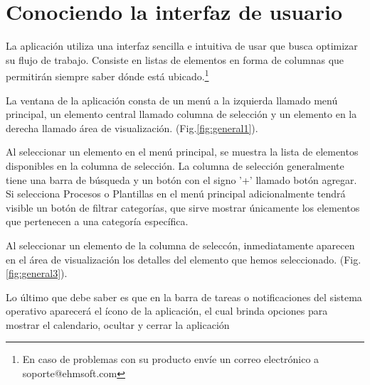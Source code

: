 

\section{Conociendo la interfaz de usuario}
La aplicaci\'on utiliza una interfaz sencilla e intuitiva de usar que busca optimizar su flujo de trabajo. Consiste en listas de elementos en forma de columnas que permitir\'an siempre saber d\'onde est\'a ubicado.\footnote{En caso de problemas con su producto env\'ie un correo
electr\'onico a \mbox{soporte@ehmsoft.com}}

La ventana de la aplicaci\'on consta de un men\'u a la izquierda llamado men\'u principal, un elemento central llamado columna de selecci\'on y un elemento en la derecha llamado \'area de visualizaci\'on. (Fig.\ref{fig:general1}). 


Al seleccionar un elemento en el men\'u principal, se muestra la lista de elementos disponibles en la columna de selecci\'on. La columna de selecci\'on generalmente tiene una barra de b\'usqueda y un bot\'on con el signo '+' llamado bot\'on agregar. Si selecciona Procesos o Plantillas en el men\'u principal adicionalmente tendr\'a visible un bot\'on de filtrar categor\'ias, que sirve mostrar \'unicamente los elementos que pertenecen a una categor\'ia espec\'ifica.

Al seleccionar un elemento de la columna de selecc\'on, inmediatamente aparecen en el \'area de visualizaci\'on los detalles del elemento que hemos seleccionado. (Fig.\ref{fig:general3}). 

Lo \'ultimo que debe saber es que en la barra de tareas o notificaciones del sistema operativo aparecer\'a el \'icono de la aplicaci\'on, el cual brinda opciones para mostrar el calendario, ocultar y cerrar la aplicaci\'on

